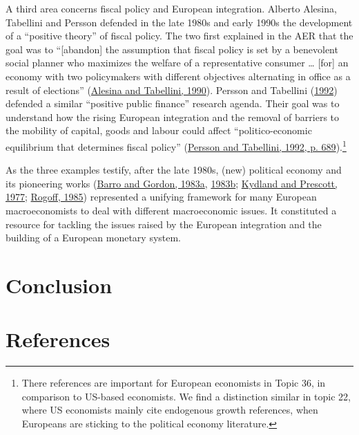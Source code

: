 \documentclass[]{elsarticle} %
\begin{document}
A third area concerns fiscal policy and European integration. Alberto
Alesina, Tabellini and Persson defended in the late 1980s and early
1990s the development of a ``positive theory'' of fiscal policy. The two
first explained in the AER that the goal was to ``{[}abandon{]} the
assumption that fiscal policy is set by a benevolent social planner who
maximizes the welfare of a representative consumer \ldots{} {[}for{]} an
economy with two policymakers with different objectives alternating in
office as a result of elections''
(\protect\hyperlink{ref-alesina1990}{Alesina and Tabellini, 1990}).
Persson and Tabellini (\protect\hyperlink{ref-persson1992}{1992})
defended a similar ``positive public finance'' research agenda. Their
goal was to understand how the rising European integration and the
removal of barriers to the mobility of capital, goods and labour could
affect ``politico-economic equilibrium that determines fiscal policy''
(\protect\hyperlink{ref-persson1992}{Persson and Tabellini, 1992, p.
689}).\footnote{There references are important for European economists
  in Topic 36, in comparison to US-based economists. We find a
  distinction similar in topic 22, where US economists mainly cite
  endogenous growth references, when Europeans are sticking to the
  political economy literature.}

As the three examples testify, after the late 1980s, (new) political
economy and its pioneering works
(\protect\hyperlink{ref-barro1983}{Barro and Gordon, 1983a},
\protect\hyperlink{ref-barro1983c}{1983b};
\protect\hyperlink{ref-kydland1977}{Kydland and Prescott, 1977};
\protect\hyperlink{ref-rogoff1985b}{Rogoff, 1985}) represented a
unifying framework for many European macroeconomists to deal with
different macroeconomic issues. It constituted a resource for tackling
the issues raised by the European integration and the building of a
European monetary system.

\hypertarget{conclusion}{%
\section*{Conclusion}\label{conclusion}}

\newpage

\hypertarget{references}{%
\section*{References}\label{references}}
\end{document}
